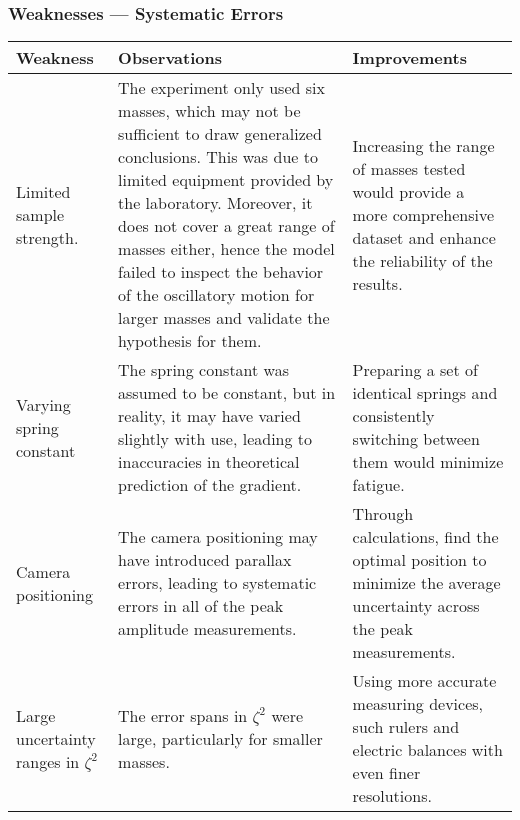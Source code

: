 \documentclass[a4paper,12pt]{article}
\newcommand{\thcolor}{\cellcolor{Blue!25}}
\begin{document}
\subsubsection{Weaknesses --- Systematic Errors}
\begin{center}
  \begin{longtable}{|p{}|p{}|p{}|}
    \hline
    \thcolor Weakness                     & \thcolor Observations                                                                                                                                                                                                                                                                                                                                        & \thcolor Improvements                                                                                                        \\ \hline
    Limited sample strength.              & The experiment only used six masses, which may not be sufficient to draw generalized conclusions. This was due to limited equipment provided by the laboratory. Moreover, it does not cover a great range of masses either, hence the model failed to inspect the behavior of the oscillatory motion for larger masses and validate the hypothesis for them. & Increasing the range of masses tested would provide a more comprehensive dataset and enhance the reliability of the results. \\ \hline
    Varying spring constant               & The spring constant was assumed to be constant, but in reality, it may have varied slightly with use, leading to inaccuracies in theoretical prediction of the gradient.                                                                                                                                                                                     & Preparing a set of identical springs and consistently switching between them would minimize fatigue.                         \\ \hline
    Camera positioning                    & The camera positioning may have introduced parallax errors, leading to systematic errors in all of the peak amplitude measurements.                                                                                                                                                                                                                          & Through calculations, find the optimal position to minimize the average uncertainty across the peak measurements.            \\ \hline
    Large uncertainty ranges in $\zeta^2$ & The error spans in $\zeta^2$ were large, particularly for smaller masses.                                                                                                                                                                                                                                                                                    & Using more accurate measuring devices, such rulers and electric balances with even finer resolutions.                        \\ \hline
  \end{longtable}
\end{center}
\end{document}
